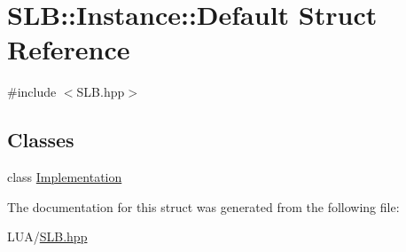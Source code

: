 \hypertarget{structSLB_1_1Instance_1_1Default}{}\section{S\+LB\+:\+:Instance\+:\+:Default Struct Reference}
\label{structSLB_1_1Instance_1_1Default}


{\ttfamily \#include $<$S\+L\+B.\+hpp$>$}

\subsection*{Classes}
\begin{DoxyCompactItemize}
\item 
class \hyperlink{classSLB_1_1Instance_1_1Default_1_1Implementation}{Implementation}
\end{DoxyCompactItemize}


The documentation for this struct was generated from the following file\+:\begin{DoxyCompactItemize}
\item 
L\+U\+A/\hyperlink{SLB_8hpp}{S\+L\+B.\+hpp}\end{DoxyCompactItemize}
